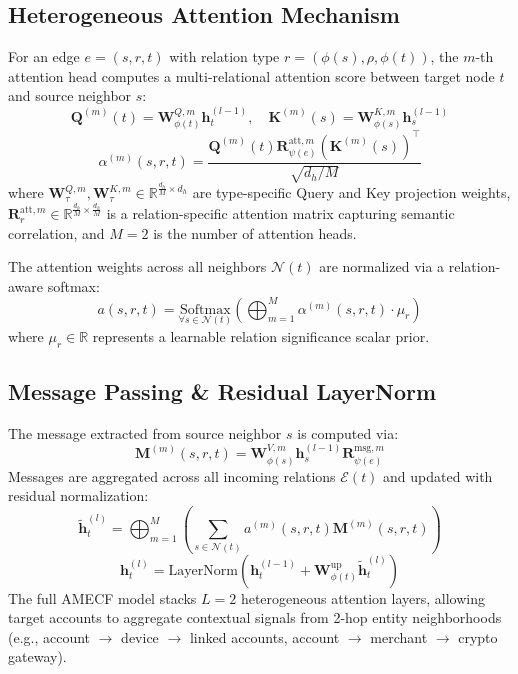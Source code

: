 \subsection{Heterogeneous Attention Mechanism}
For an edge $e = (s, r, t)$ with relation type $r = (\phi(s), \rho, \phi(t))$, the $m$-th attention head computes a multi-relational attention score between target node $t$ and source neighbor $s$:
\begin{equation}
    \mathbf{Q}^{(m)}(t) = \mathbf{W}_{\phi(t)}^{Q, m} \mathbf{h}_t^{(l-1)}, \quad \mathbf{K}^{(m)}(s) = \mathbf{W}_{\phi(s)}^{K, m} \mathbf{h}_s^{(l-1)}
\end{equation}
\begin{equation}
    \alpha^{(m)}(s, r, t) = \frac{\mathbf{Q}^{(m)}(t) \mathbf{R}_{\psi(e)}^{\text{att}, m} (\mathbf{K}^{(m)}(s))^\top}{\sqrt{d_h / M}}
\end{equation}
where $\mathbf{W}_\tau^{Q, m}, \mathbf{W}_\tau^{K, m} \in \mathbb{R}^{\frac{d_h}{M} \times d_h}$ are type-specific Query and Key projection weights, $\mathbf{R}_r^{\text{att}, m} \in \mathbb{R}^{\frac{d_h}{M} \times \frac{d_h}{M}}$ is a relation-specific attention matrix capturing semantic correlation, and $M = 2$ is the number of attention heads.

The attention weights across all neighbors $\mathcal{N}(t)$ are normalized via a relation-aware softmax:
\begin{equation}
    a(s, r, t) = \underset{\forall s \in \mathcal{N}(t)}{\text{Softmax}} \left( \bigoplus_{m=1}^M \alpha^{(m)}(s, r, t) \cdot \mu_r \right)
\end{equation}
where $\mu_r \in \mathbb{R}$ represents a learnable relation significance scalar prior.

\subsection{Message Passing \&  Residual LayerNorm}
The message extracted from source neighbor $s$ is computed via:
\begin{equation}
    \mathbf{M}^{(m)}(s, r, t) = \mathbf{W}_{\phi(s)}^{V, m} \mathbf{h}_s^{(l-1)} \mathbf{R}_{\psi(e)}^{\text{msg}, m}
\end{equation}
Messages are aggregated across all incoming relations $\mathcal{E}(t)$ and updated with residual normalization:
\begin{equation}
    \tilde{\mathbf{h}}_t^{(l)} = \bigoplus_{m=1}^M \left( \sum_{s \in \mathcal{N}(t)} a^{(m)}(s, r, t) \mathbf{M}^{(m)}(s, r, t) \right)
\end{equation}
\begin{equation}
    \mathbf{h}_t^{(l)} = \text{LayerNorm}\left( \mathbf{h}_t^{(l-1)} + \mathbf{W}_{\phi(t)}^{\text{up}} \tilde{\mathbf{h}}_t^{(l)} \right)
\end{equation}
The full AMECF model stacks $L = 2$ heterogeneous attention layers, allowing target accounts to aggregate contextual signals from 2-hop entity neighborhoods (e.g., account $\to$ device $\to$ linked accounts, account $\to$ merchant $\to$ crypto gateway).

